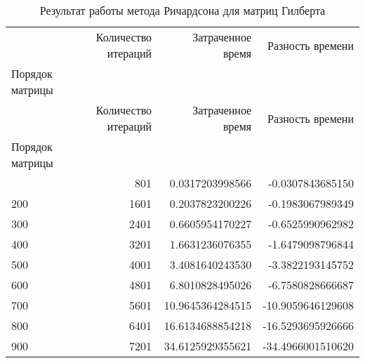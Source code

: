 \begin{longtable}{lrrr}
\label{rich_hilbert}\\
\caption{Результат работы метода Ричардсона для матриц Гилберта}\\
\toprule
 & Количество итераций & Затраченное время & Разность времени \\
Порядок матрицы &  &  &  \\
\midrule
\endfirsthead
\toprule
 & Количество итераций & Затраченное время & Разность времени \\
Порядок матрицы &  &  &  \\
\midrule
\endhead
\midrule
\endfoot
\bottomrule
\endlastfoot
100 & 801 & 0.0317203998566 & -0.0307843685150 \\
200 & 1601 & 0.2037823200226 & -0.1983067989349 \\
300 & 2401 & 0.6605954170227 & -0.6525990962982 \\
400 & 3201 & 1.6631236076355 & -1.6479098796844 \\
500 & 4001 & 3.4081640243530 & -3.3822193145752 \\
600 & 4801 & 6.8010828495026 & -6.7580828666687 \\
700 & 5601 & 10.9645364284515 & -10.9059646129608 \\
800 & 6401 & 16.6134688854218 & -16.5293695926666 \\
900 & 7201 & 34.6125929355621 & -34.4966001510620 \\
\end{longtable}
